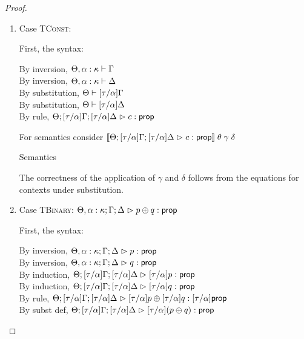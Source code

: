 \begin{proof}
\begin{enumerate}
\item Case \textsc{TConst}:

  First, the syntax: 
  \begin{tabbedproof}
    \oo By inversion, $\judgectx{\Theta, \alpha:\kappa}{\Gamma}$ \\
    \oo By inversion, $\judgectx{\Theta, \alpha:\kappa}{\Delta}$ \\
    \oo By substitution, $\judgectx{\Theta}{[\tau/\alpha]\Gamma}$ \\
    \oo By substitution, $\judgectx{\Theta}{[\tau/\alpha]\Delta}$ \\
    \oo By rule, $\judgeA[\Theta; {[\tau/\alpha]}\Gamma; {[\tau/\alpha]}\Delta]{c}{\assert}$
  \end{tabbedproof}

  For semantics consider $\interp{\judgeA[\Theta; {[\tau/\alpha]}\Gamma; {[\tau/\alpha]}\Delta]{c}{\assert}}\;\theta\;\gamma\;\delta$ 
  \begin{eqnproof}
          {Semantics}
  \end{eqnproof}
  The correctness of the application of $\gamma$ and $\delta$ follows from the equations for contexts
  under substitution. 

\item Case \textsc{TBinary}: $\judgeA[\Theta, \alpha:\kappa; \Gamma; \Delta]{p \oplus q}{\assert}$
  
  First, the syntax:
  \begin{tabbedproof}
    \oo By inversion, $\judgeA[\Theta, \alpha:\kappa; \Gamma; \Delta]{p}{\assert}$\\
    \oo By inversion, $\judgeA[\Theta, \alpha:\kappa; \Gamma; \Delta]{q}{\assert}$\\
    \oo By induction, $\judgeA[\Theta; {[\tau/\alpha]}\Gamma; {[\tau/\alpha]}\Delta]{{[\tau/\alpha]}p}{\assert}$\\
    \oo By induction, $\judgeA[\Theta; {[\tau/\alpha]}\Gamma; {[\tau/\alpha]}\Delta]{{[\tau/\alpha]}q}{\assert}$\\
    \oo By rule, $\judgeA[\Theta; {[\tau/\alpha]}\Gamma; {[\tau/\alpha]}\Delta]{{[\tau/\alpha]}p \oplus {[\tau/\alpha]}q}{{[\tau/\alpha]}\assert}$\\
    \oo By subst def, $\judgeA[\Theta; {[\tau/\alpha]}\Gamma; {[\tau/\alpha]}\Delta]{{[\tau/\alpha]}(p \oplus q)}{\assert}$\\
  \end{tabbedproof}


\end{enumerate}
\end{proof}

